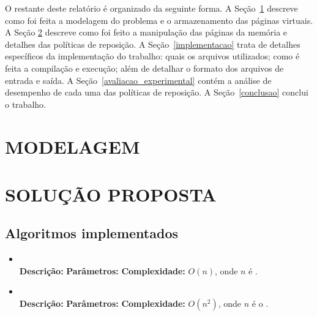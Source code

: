 \documentclass[12pt]{article}
\begin{document}
	O restante deste relatório é organizado da seguinte forma. A Seção~\ref{modelagem} descreve como foi feita a modelagem do problema e o armazenamento das páginas virtuais. A Seção \ref{solucao_proposta} descreve como foi feito a manipulação das páginas da memória e detalhes das políticas de reposição. A Seção~\ref{implementacao} trata de detalhes específicos da implementação do trabalho: quais os arquivos utilizados; como é feita a compilação e execução; além de detalhar o formato dos arquivos de entrada e saída. A Seção~\ref{avaliacao_experimental} contém a análise de desempenho de cada uma das políticas de reposição. A Seção~\ref{conclusao} conclui o trabalho.


\section{MODELAGEM}
\label{modelagem}



\section{SOLUÇÃO PROPOSTA}
\label{solucao_proposta}

\subsection{Algoritmos implementados}

\begin{itemize}
 \item \begin{large}\textit{}\end{large}\\
 \subitem \textbf{Descrição:}
 \subitem \textbf{Parâmetros:}
 \subitem \textbf{Complexidade:} $O(n)$, onde $n$ é .
\end{itemize}

\vspace{0.2 true cm}

\begin{itemize}
 \item \begin{large}\textit{}\end{large}\\
 \subitem \textbf{Descrição:}
 \subitem \textbf{Parâmetros:}
 \subitem \textbf{Complexidade:} $O(n^2)$, onde $n$ é o .
\end{itemize}

\vspace{0.2 true cm}
\end{document}
